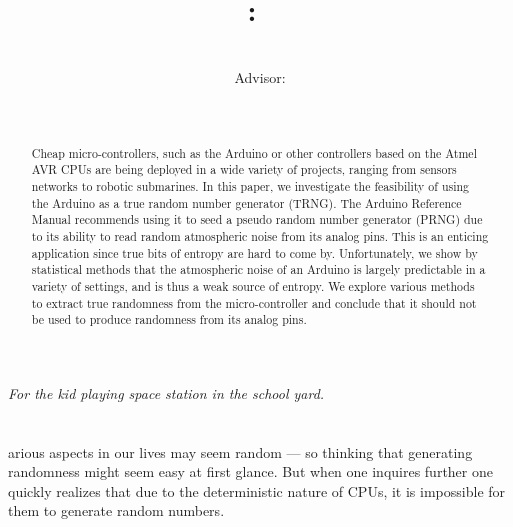 \documentclass[a4paper]{article}           %
\title{
    \Class:\ \Title
    \ifthenelse{\equal{\SubTitle}{}}{}{\\{\SubTitle}}
    }
\date{\small{\DueLang\ \DueDate}}
\author{\AuthorName\\Advisor: \ClassInstructor}
\newcommand{\tmpsection}[1]{}
\let\tmpsection=\section
\renewcommand{\section}[2]{

    \ifthenelse{
      \equal{#2}{Heimildir} %
    }
    {
      \tmpsection{\sc{#1} }
      \tmpsection{\sc{#2} }
    }
    {\tmpsection{\sc{#1} } }
      

}
\begin{document}
\maketitle

\begin{center}
\textit{For the kid playing space station in the school yard. }
\end{center}



\begin{abstract}

  Cheap micro-controllers, such as the Arduino or other controllers
  based on the Atmel AVR CPUs are being deployed in a wide variety of
  projects, ranging from sensors networks to robotic submarines. In
  this paper, we investigate the feasibility of using the Arduino as a
  true random number generator (TRNG). The Arduino Reference Manual
  recommends using it to seed a pseudo random number generator (PRNG)
  due to its ability to read random atmospheric noise from its
  analog pins. This is an enticing application since true bits
  of entropy are hard to come by. Unfortunately, we show by
  statistical methods that the atmospheric noise of an Arduino is
  largely predictable in a variety of settings, and is thus a weak
  source of entropy. We explore various methods to extract true
  randomness from the micro-controller and conclude that it should not
  be used to produce randomness from its analog pins.

\end{abstract}

\section{Introduction}

Various aspects in our lives may seem random --- so thinking that generating randomness might seem easy at first glance. But when one inquires further one quickly realizes that due to the deterministic nature of CPUs, it is impossible for them to generate random numbers. 
\end{document}
